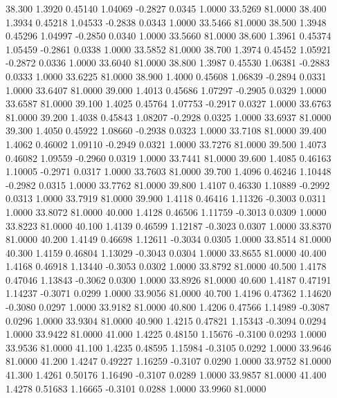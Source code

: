   38.300   1.3920   0.45140   1.04069  -0.2827   0.0345   1.0000  33.5269  81.0000
  38.400   1.3934   0.45218   1.04533  -0.2838   0.0343   1.0000  33.5466  81.0000
  38.500   1.3948   0.45296   1.04997  -0.2850   0.0340   1.0000  33.5660  81.0000
  38.600   1.3961   0.45374   1.05459  -0.2861   0.0338   1.0000  33.5852  81.0000
  38.700   1.3974   0.45452   1.05921  -0.2872   0.0336   1.0000  33.6040  81.0000
  38.800   1.3987   0.45530   1.06381  -0.2883   0.0333   1.0000  33.6225  81.0000
  38.900   1.4000   0.45608   1.06839  -0.2894   0.0331   1.0000  33.6407  81.0000
  39.000   1.4013   0.45686   1.07297  -0.2905   0.0329   1.0000  33.6587  81.0000
  39.100   1.4025   0.45764   1.07753  -0.2917   0.0327   1.0000  33.6763  81.0000
  39.200   1.4038   0.45843   1.08207  -0.2928   0.0325   1.0000  33.6937  81.0000
  39.300   1.4050   0.45922   1.08660  -0.2938   0.0323   1.0000  33.7108  81.0000
  39.400   1.4062   0.46002   1.09110  -0.2949   0.0321   1.0000  33.7276  81.0000
  39.500   1.4073   0.46082   1.09559  -0.2960   0.0319   1.0000  33.7441  81.0000
  39.600   1.4085   0.46163   1.10005  -0.2971   0.0317   1.0000  33.7603  81.0000
  39.700   1.4096   0.46246   1.10448  -0.2982   0.0315   1.0000  33.7762  81.0000
  39.800   1.4107   0.46330   1.10889  -0.2992   0.0313   1.0000  33.7919  81.0000
  39.900   1.4118   0.46416   1.11326  -0.3003   0.0311   1.0000  33.8072  81.0000
  40.000   1.4128   0.46506   1.11759  -0.3013   0.0309   1.0000  33.8223  81.0000
  40.100   1.4139   0.46599   1.12187  -0.3023   0.0307   1.0000  33.8370  81.0000
  40.200   1.4149   0.46698   1.12611  -0.3034   0.0305   1.0000  33.8514  81.0000
  40.300   1.4159   0.46804   1.13029  -0.3043   0.0304   1.0000  33.8655  81.0000
  40.400   1.4168   0.46918   1.13440  -0.3053   0.0302   1.0000  33.8792  81.0000
  40.500   1.4178   0.47046   1.13843  -0.3062   0.0300   1.0000  33.8926  81.0000
  40.600   1.4187   0.47191   1.14237  -0.3071   0.0299   1.0000  33.9056  81.0000
  40.700   1.4196   0.47362   1.14620  -0.3080   0.0297   1.0000  33.9182  81.0000
  40.800   1.4206   0.47566   1.14989  -0.3087   0.0296   1.0000  33.9304  81.0000
  40.900   1.4215   0.47821   1.15343  -0.3094   0.0294   1.0000  33.9422  81.0000
  41.000   1.4225   0.48150   1.15676  -0.3100   0.0293   1.0000  33.9536  81.0000
  41.100   1.4235   0.48595   1.15984  -0.3105   0.0292   1.0000  33.9646  81.0000
  41.200   1.4247   0.49227   1.16259  -0.3107   0.0290   1.0000  33.9752  81.0000
  41.300   1.4261   0.50176   1.16490  -0.3107   0.0289   1.0000  33.9857  81.0000
  41.400   1.4278   0.51683   1.16665  -0.3101   0.0288   1.0000  33.9960  81.0000
